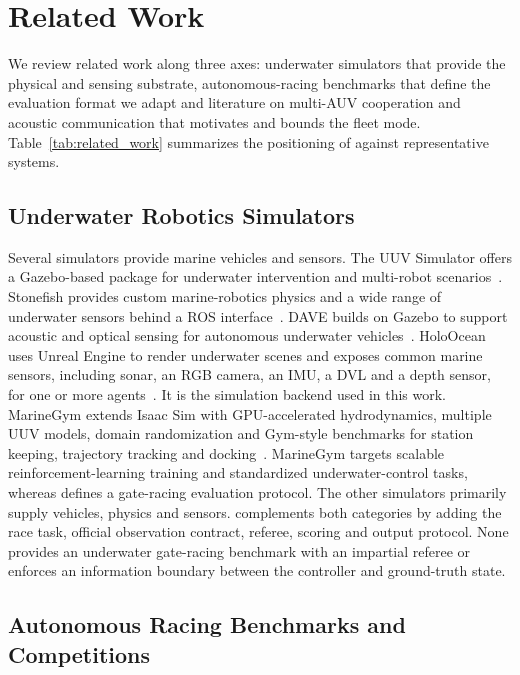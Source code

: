 \section{Related Work}
\label{sec:related_work}

We review related work along three axes: underwater simulators that provide the physical and sensing substrate, autonomous-racing benchmarks that define the evaluation format we adapt and literature on multi-AUV cooperation and acoustic communication that motivates and bounds the fleet mode. Table~\ref{tab:related_work} summarizes the positioning of \mra{} against representative systems.



\subsection{Underwater Robotics Simulators}

Several simulators provide marine vehicles and sensors. The UUV Simulator offers a Gazebo-based package for underwater intervention and multi-robot scenarios~\cite{manhas2016uuvsim}. Stonefish provides custom marine-robotics physics and a wide range of underwater sensors behind a ROS interface~\cite{cieslak2019stonefish}. DAVE builds on Gazebo to support acoustic and optical sensing for autonomous underwater vehicles~\cite{zhang2022dave}. HoloOcean uses Unreal Engine to render underwater scenes and exposes common marine sensors, including sonar, an RGB camera, an IMU, a DVL and a depth sensor, for one or more agents~\cite{potokar2022holoocean}. It is the simulation backend used in this work. MarineGym extends Isaac Sim with GPU-accelerated hydrodynamics, multiple UUV models, domain randomization and Gym-style benchmarks for station keeping, trajectory tracking and docking~\cite{chu2025marinegym}. MarineGym targets scalable reinforcement-learning training and standardized underwater-control tasks, whereas \mra{} defines a gate-racing evaluation protocol. The other simulators primarily supply vehicles, physics and sensors. \mra{} complements both categories by adding the race task, official observation contract, referee, scoring and output protocol. None provides an underwater gate-racing benchmark with an impartial referee or enforces an information boundary between the controller and ground-truth state.

\subsection{Autonomous Racing Benchmarks and Competitions}

